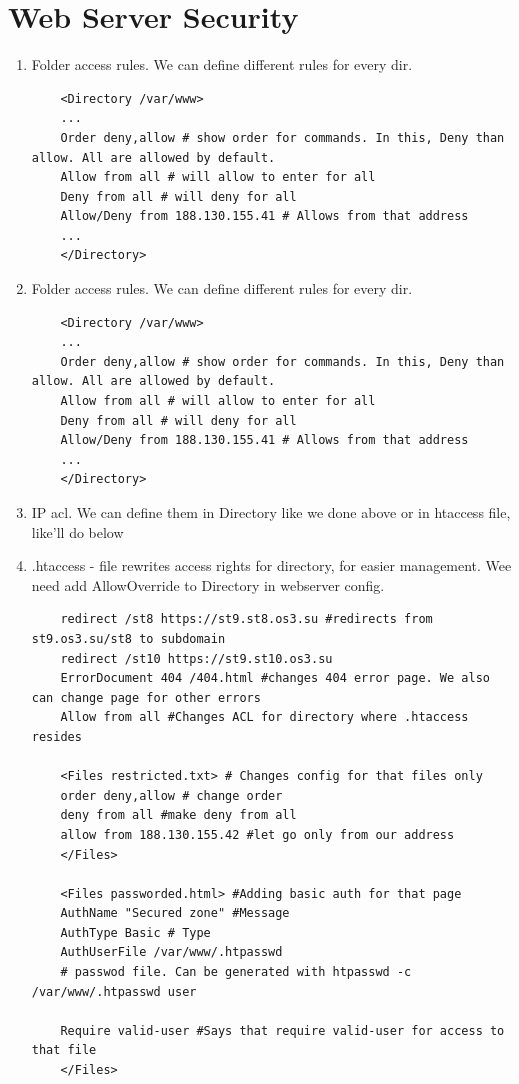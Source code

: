 \documentclass[10pt]{article}
\begin{document}
\section{Web Server Security}
\begin{enumerate}
\item Folder access rules. We can define different rules for every dir.
\begin{verbatim}
    <Directory /var/www>
    ...
    Order deny,allow # show order for commands. In this, Deny than allow. All are allowed by default.
    Allow from all # will allow to enter for all
    Deny from all # will deny for all
    Allow/Deny from 188.130.155.41 # Allows from that address
    ...
    </Directory>
\end{verbatim}

\item Folder access rules. We can define different rules for every dir.
\begin{verbatim}
    <Directory /var/www>
    ...
    Order deny,allow # show order for commands. In this, Deny than allow. All are allowed by default.
    Allow from all # will allow to enter for all
    Deny from all # will deny for all
    Allow/Deny from 188.130.155.41 # Allows from that address
    ...
    </Directory>
\end{verbatim}

\item IP acl. We can define them in Directory like we done above or in htaccess file, like'll do below
\item .htaccess - file rewrites access rights for directory, for easier management. Wee need add AllowOverride to Directory in webserver config.
\begin{verbatim}
    redirect /st8 https://st9.st8.os3.su #redirects from st9.os3.su/st8 to subdomain
    redirect /st10 https://st9.st10.os3.su
    ErrorDocument 404 /404.html #changes 404 error page. We also can change page for other errors
    Allow from all #Changes ACL for directory where .htaccess resides

    <Files restricted.txt> # Changes config for that files only
    order deny,allow # change order
    deny from all #make deny from all
    allow from 188.130.155.42 #let go only from our address
    </Files>

    <Files passworded.html> #Adding basic auth for that page
    AuthName "Secured zone" #Message
    AuthType Basic # Type
    AuthUserFile /var/www/.htpasswd 
    # passwod file. Can be generated with htpasswd -c /var/www/.htpasswd user

    Require valid-user #Says that require valid-user for access to that file
    </Files>
\end{verbatim}
\end{enumerate}
\end{document}
